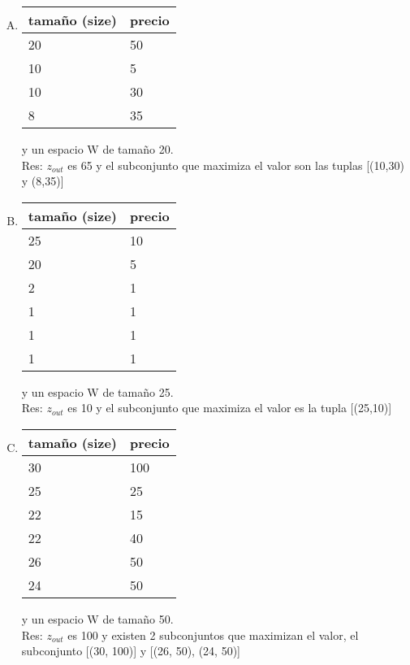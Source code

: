 \documentclass[fleqn, 11pt]{article}
\begin{document}
\begin{enumerate}[A.]

\item
\begin{tabular}{l l}
	tamaño (size) & precio \\ \toprule
    20 & 50 \\
    10 & 5  \\
    10 & 30 \\
    8 & 35  \\
\end{tabular}
y un espacio W de tamaño 20. \\

Res: $z_{out}$ es 65 y el subconjunto que maximiza el valor son las tuplas [(10,30) y (8,35)] \\

\item
\begin{tabular}{l l}
	tamaño (size) & precio \\ \toprule
    25 & 10 \\
    20 & 5 \\
    2  & 1 \\
    1  & 1 \\
    1  & 1 \\
    1  & 1 \\
\end{tabular}
y un espacio W de tamaño 25. \\

Res: $z_{out}$ es 10 y el subconjunto que maximiza el valor es la tupla [(25,10)] \\

\item
\begin{tabular}{l l}
	tamaño (size) & precio \\ \toprule
    30 & 100 \\
    25 & 25  \\
    22 & 15  \\
    22 & 40  \\
    26 & 50  \\
    24 & 50  \\

\end{tabular}
y un espacio W de tamaño 50. \\

Res: $z_{out}$ es 100 y existen 2 subconjuntos que maximizan el valor, el subconjunto [(30, 100)] y [(26, 50), (24, 50)]

\end{enumerate}
\end{document}
